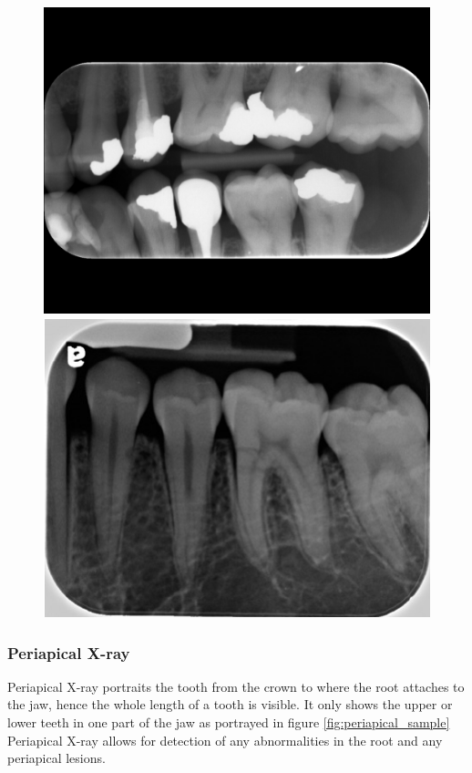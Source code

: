 \begin{figure}
    \begin{floatrow}[2]
        {\includegraphics[width=\linewidth]{images/bitewing_xray.png}}\;
        {\includegraphics[width=\linewidth]{images/periapical_xray.png}}
    \end{floatrow}
\end{figure}

\subsubsection{Periapical X-ray}
Periapical X-ray portraits the tooth from the crown to where the root attaches to the jaw, hence the whole length of a tooth is visible. It only shows the upper or lower teeth in one part of the jaw as portrayed in figure \ref{fig:periapical_sample}  Periapical X-ray allows for detection of any abnormalities in the root and any periapical lesions.

